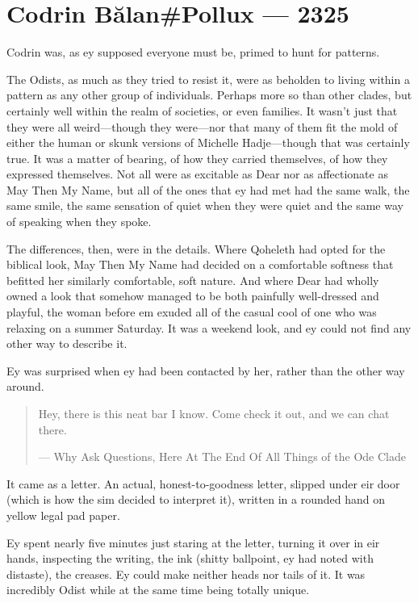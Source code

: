 \hypertarget{codrin-bux103lanpollux-2325}{%
\chapter{Codrin Bălan\#Pollux — 2325}\label{codrin-bux103lanpollux-2325}}

Codrin was, as ey supposed everyone must be, primed to hunt for patterns.

The Odists, as much as they tried to resist it, were as beholden to living within a pattern as any other group of individuals. Perhaps more so than other clades, but certainly well within the realm of societies, or even families. It wasn't just that they were all weird---though they were---nor that many of them fit the mold of either the human or skunk versions of Michelle Hadje---though that was certainly true. It was a matter of bearing, of how they carried themselves, of how they expressed themselves. Not all were as excitable as Dear nor as affectionate as May Then My Name, but all of the ones that ey had met had the same walk, the same smile, the same sensation of quiet when they were quiet and the same way of speaking when they spoke.

The differences, then, were in the details. Where Qoheleth had opted for the biblical look, May Then My Name had decided on a comfortable softness that befitted her similarly comfortable, soft nature. And where Dear had wholly owned a look that somehow managed to be both painfully well-dressed and playful, the woman before em exuded all of the casual cool of one who was relaxing on a summer Saturday. It was a weekend look, and ey could not find any other way to describe it.

Ey was surprised when ey had been contacted by her, rather than the other way around.

\begin{quote}
Hey, there is this neat bar I know. Come check it out, and we can chat there.

--- Why Ask Questions, Here At The End Of All Things of the Ode Clade
\end{quote}

\noindent It came as a letter. An actual, honest-to-goodness letter, slipped under eir door (which is how the sim decided to interpret it), written in a rounded hand on yellow legal pad paper.

Ey spent nearly five minutes just staring at the letter, turning it over in eir hands, inspecting the writing, the ink (shitty ballpoint, ey had noted with distaste), the creases. Ey could make neither heads nor tails of it. It was incredibly Odist while at the same time being totally unique.

